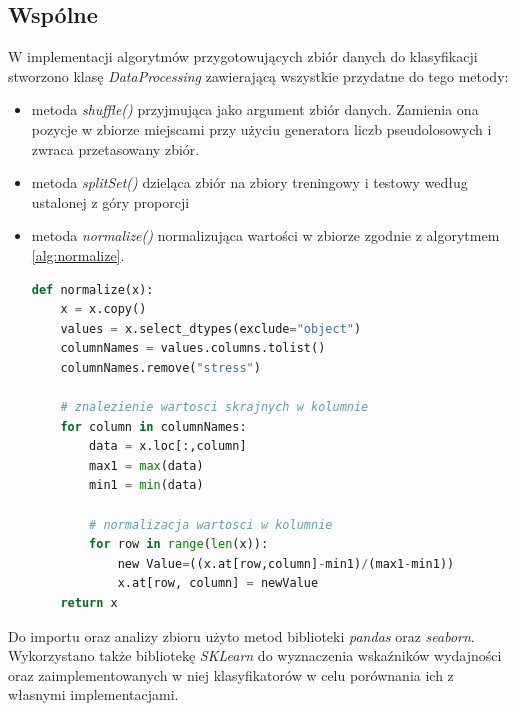 \documentclass[12pt,a4paper]{article}
\begin{document}
        \subsection{Wspólne}
            W implementacji algorytmów przygotowujących zbiór danych do klasyfikacji stworzono klasę \textit{DataProcessing} zawierającą wszystkie przydatne do tego metody:
            \begin{itemize}
                \item metoda \textit{shuffle()} przyjmująca jako argument zbiór danych. Zamienia ona pozycje w zbiorze miejscami przy użyciu generatora liczb pseudolosowych i zwraca przetasowany zbiór.
                
                \item metoda \textit{splitSet()} dzieląca zbiór na zbiory treningowy i testowy według ustalonej z góry proporcji
                
                \item metoda \textit{normalize()} normalizująca wartości w zbiorze zgodnie z algorytmem \ref{alg:normalize}.
                
                \begin{lstlisting}[language=Python, caption=metoda \textit{normalize()}, label=lst:normalize]
def normalize(x):
    x = x.copy()
    values = x.select_dtypes(exclude="object")
    columnNames = values.columns.tolist()
    columnNames.remove("stress")
    
    # znalezienie wartosci skrajnych w kolumnie
    for column in columnNames:
        data = x.loc[:,column]
        max1 = max(data)
        min1 = min(data)
        
        # normalizacja wartosci w kolumnie
        for row in range(len(x)):
            new Value=((x.at[row,column]-min1)/(max1-min1))
            x.at[row, column] = newValue
    return x
                \end{lstlisting}
            \end{itemize}
            
            Do importu oraz analizy zbioru użyto metod biblioteki \textit{pandas} oraz \textit{seaborn}. Wykorzystano także bibliotekę \textit{SKLearn} do wyznaczenia wskaźników wydajności oraz zaimplementowanych w niej klasyfikatorów w celu porównania ich z własnymi implementacjami.
        
\end{document}
